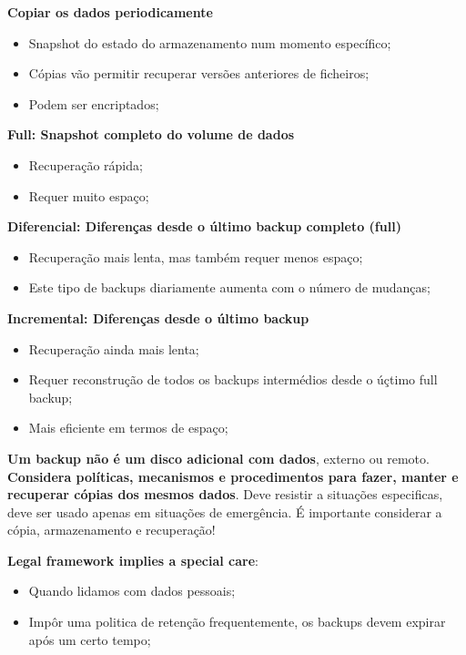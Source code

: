 \documentclass{article}
\begin{document}
\begin{flushleft}
  \textbf{Copiar os dados periodicamente}
  \begin{itemize}
    \item Snapshot do estado do armazenamento num momento específico;
    \item Cópias vão permitir recuperar versões anteriores de ficheiros;
    \item Podem ser encriptados;
  \end{itemize}

  \textbf{Full: Snapshot completo do volume de dados}
  \begin{itemize}
    \item Recuperação rápida;
    \item Requer muito espaço;
  \end{itemize}

  \textbf{Diferencial: Diferenças desde o último backup completo (full)}
  \begin{itemize}
    \item Recuperação mais lenta, mas também requer menos espaço;
    \item Este tipo de backups diariamente aumenta com o número de mudanças;
  \end{itemize}

  \textbf{Incremental: Diferenças desde o último backup}
  \begin{itemize}
    \item Recuperação ainda mais lenta;
    \item Requer reconstrução de todos os backups intermédios desde o úçtimo full backup;
    \item Mais eficiente em termos de espaço;
  \end{itemize}
\end{flushleft}

\textbf{Um backup não é um disco adicional com dados}, externo ou remoto. 
\textbf{Considera políticas, mecanismos e procedimentos para
fazer, manter e recuperar cópias dos mesmos dados}.
Deve resistir a situações especificas, deve ser usado apenas
em situações de emergência. É importante considerar
a cópia, armazenamento e recuperação!

\textbf{Legal framework implies a special care}:
\begin{itemize}
  \item Quando lidamos com dados pessoais;
  \item Impôr uma politica de retenção frequentemente, os backups
  devem expirar após um certo tempo;
\end{itemize}
\end{document}
